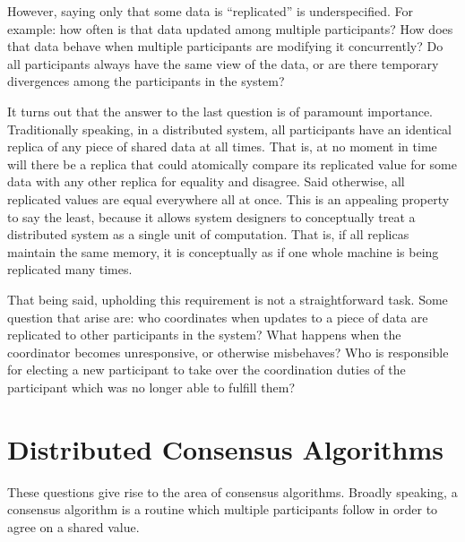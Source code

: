 However, saying only that some data is ``replicated'' is underspecified. For
example: how often is that data updated among multiple participants? How does
that data behave when multiple participants are modifying it concurrently? Do
all participants always have the same view of the data, or are there temporary
divergences among the participants in the system?

It turns out that the answer to the last question is of paramount importance.
Traditionally speaking, in a distributed system, all participants have an
identical replica of any piece of shared data at all times. That is, at no
moment in time will there be a replica that could atomically compare its
replicated value for some data with any other replica for equality and disagree.
Said otherwise, all replicated values are equal everywhere all at once. This is
an appealing property to say the least, because it allows system designers to
conceptually treat a distributed system as a single unit of computation. That
is, if all replicas maintain the same memory, it is conceptually as if one whole
machine is being replicated many times.

That being said, upholding this requirement is not a straightforward task. Some
question that arise are: who coordinates when updates to a piece of data are
replicated to other participants in the system? What happens when the
coordinator becomes unresponsive, or otherwise misbehaves? Who is responsible
for electing a new participant to take over the coordination duties of the
participant which was no longer able to fulfill them?

\section{Distributed Consensus Algorithms}
\label{sec:dca-safety}

These questions give rise to the area of consensus algorithms. Broadly speaking,
a consensus algorithm is a routine which multiple participants follow in order
to agree on a shared value.

